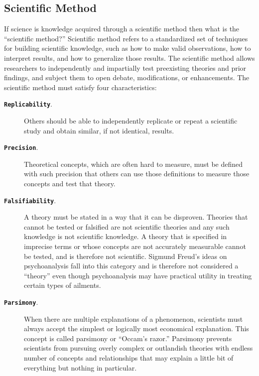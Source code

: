 \subsection{Scientific Method}

If science is knowledge acquired through a scientific method then what is the ``scientific method?'' Scientific method refers to a standardized set of techniques for building scientific knowledge, such as how to make valid observations, how to interpret results, and how to generalize those results. The scientific method allows researchers to independently and impartially test preexisting theories and prior findings, and subject them to open debate, modifications, or enhancements. The scientific method must satisfy four characteristics:

\begin{description}
	\item[\textbf{\texttt{Replicability}}.] Others should be able to independently replicate or repeat a scientific study and obtain similar, if not identical, results.

	\item[\textbf{\texttt{Precision}}.] Theoretical concepts, which are often hard to measure, must be defined with such precision that others can use those definitions to measure those concepts and test that theory.

	\item[\textbf{\texttt{Falsifiability}}.] A theory must be stated in a way that it can be disproven. Theories that cannot be tested or falsified are not scientific theories and any such knowledge is not scientific knowledge. A theory that is specified in imprecise terms or whose concepts are not accurately measurable cannot be tested, and is therefore not scientific. Sigmund Freud's ideas on psychoanalysis fall into this category and is therefore not considered a ``theory'' even though psychoanalysis may have practical utility in treating certain types of ailments.

	\item[\textbf{\texttt{Parsimony}}.] When there are multiple explanations of a phenomenon, scientists must always accept the simplest or logically most economical explanation. This concept is called parsimony or ``Occam's razor.'' Parsimony prevents scientists from pursuing overly complex or outlandish theories with endless number of concepts and relationships that may explain a little bit of everything but nothing in particular.
\end{description}


